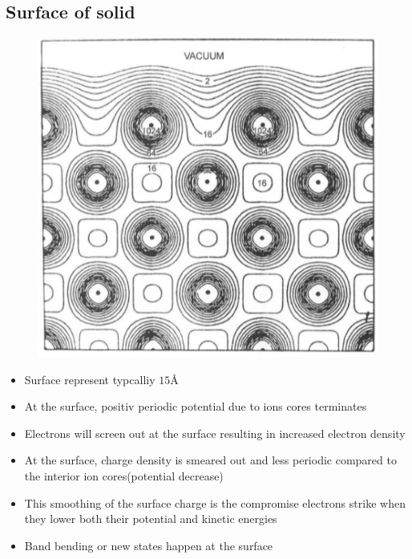 \subsection{Surface of solid}
\begin{figure}[h]
    \centering
    \includegraphics[width=\columnwidth]{images/surface.png}
    \label{fig:surface}
\end{figure}
\begin{itemize}
    \item Surface represent typcalliy \(15\)\r{A}
    \item At the surface, positiv periodic potential due to ions cores terminates
    \item Electrons will screen out at the surface resulting in  increased electron density
    \item At the surface, charge density is smeared out and less periodic compared to the interior ion cores(potential decrease)
    \item This smoothing of the surface charge is the compromise electrons strike when they lower both their potential and kinetic energies
    \item Band bending or new states happen at the surface
\end{itemize}
